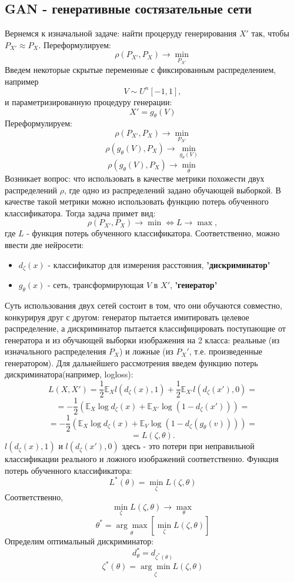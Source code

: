 \documentclass[a4paper]{article}
\begin{document}
		\subsection{GAN - генеративные состязательные сети}
				Вернемся к изначальной задаче: найти процеруду генерирования $X'$ так, чтобы $ P_{X'} \approx P_X$.
				Переформулируем:
				$$ \rho(P_{X'}, P_X) \longrightarrow \underset{P_{X'}}{\min} $$
				Введем некоторые скрытые переменные с фиксированным распределением, например
				$$ V \sim U^n [-1, 1], $$
				и параметризированную процедуру генерации:
				$$ X' = g_{\theta}(V) $$
				Переформулируем:
				$$ \rho(P_{X'}, P_X) \longrightarrow \underset{P_{X'}}{\min} $$
				$$ \rho(g_{\theta}(V), P_X) \longrightarrow \underset{g_{\theta}(V)}{\min} $$
				$$ \rho(g_{\theta}(V), P_X) \longrightarrow \underset{\theta}{\min} $$
				Возникает вопрос: что использовать в качестве метрики похожести двух распределений $\rho$, где одно из распределений задано обучающей выборкой.
				В качестве такой метрики можно использовать функцию потерь обученного классификатора. Тогда задача примет вид:
				$$ \rho(P_{X'}, P_X) \longrightarrow \min \Leftrightarrow L \longrightarrow \max, $$
				где $L$ - функция потерь обученного классификатора.
				Соответственно, можно ввести две нейросети:
					\begin{itemize}
						\item $d_{\zeta}(x)$ - классификатор для измерения расстояния, \textbf{'дискриминатор'}
						\item $g_{\theta}(x)$ - сеть, трансформирующая $V$ в $X'$, \textbf{'генератор'}
					\end{itemize}
					Суть использования двух сетей состоит в том, что они обучаются совместно, конкурируя друг с другом: генератор пытается имитировать целевое распределение, а дискриминатор пытается классифицировать поступающие от генератора и из обучающей выборки изображения на 2 класса: реальные (из изначального распределения $P_X$) и ложные (из $P_X'$, т.е. произведенные генератором).
					Для дальнейшего рассмотрения введем функцию потерь дискриминатора(например, logloss):
					$$ L(X, X') = \frac{1}{2} \mathbb{E}_{X} l(d_{\zeta}(x), 1) + \frac{1}{2} \mathbb{E}_{X'} l(d_{\zeta}(x'), 0) = $$
					$$ = -\frac{1}{2} (\mathbb{E}_{X} \log d_{\zeta}(x) + \mathbb{E}_{X'} \log (1 - d_{\zeta}(x'))) = $$
					$$ =  -\frac{1}{2} (\mathbb{E}_{X} \log d_{\zeta}(x) + \mathbb{E}_{V} \log (1 - d_{\zeta}(g_{\theta}(v)))) = $$
					$$ = L(\zeta, \theta) .$$
					$l(d_{\zeta}(x), 1)$ и $ l(d_{\zeta}(x'), 0) $ здесь - это потери при неправильной классификации реального и ложного изображений соответственно.
					Функция потерь обученного классификатора:
					$$ L^*(\theta) = \underset{\zeta}{\min} L(\zeta, \theta) $$
					Соответственно,
					$$ \underset{\zeta}{\min} L(\zeta, \theta) \longrightarrow \underset{\theta}{\max} $$
					$$ \theta^* = \underset{\theta}{\arg\max} \left[ \underset{\zeta}{\min} L(\zeta, \theta) \right] $$
					Определим оптимальный дискриминатор:
					$$ d^*_{\theta} = d_{\zeta^*(\theta)} $$
					$$ \zeta^*(\theta) =  \underset{\zeta}{\arg\min} L(\zeta, \theta)$$
\end{document}
